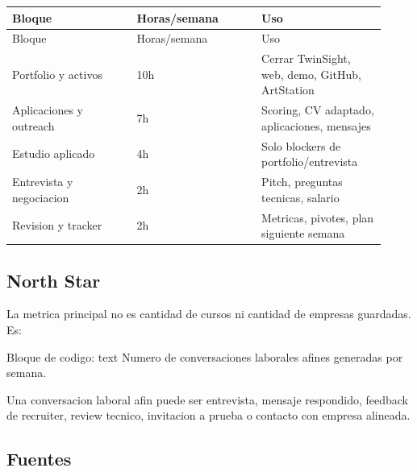 \begin{center}
\scriptsize
\begin{longtable}{>{\raggedright\arraybackslash}p{0.305\linewidth} >{\raggedright\arraybackslash}p{0.305\linewidth} >{\raggedright\arraybackslash}p{0.305\linewidth}}
\toprule
Bloque & Horas/semana & Uso \\
\midrule
\endfirsthead
\toprule
Bloque & Horas/semana & Uso \\
\midrule
\endhead
Portfolio y activos & 10h & Cerrar TwinSight, web, demo, GitHub, ArtStation \\
Aplicaciones y outreach & 7h & Scoring, CV adaptado, aplicaciones, mensajes \\
Estudio aplicado & 4h & Solo blockers de portfolio/entrevista \\
Entrevista y negociacion & 2h & Pitch, preguntas tecnicas, salario \\
Revision y tracker & 2h & Metricas, pivotes, plan siguiente semana \\
\bottomrule
\end{longtable}
\end{center}



\subsection{North Star}


La metrica principal no es cantidad de cursos ni cantidad de empresas guardadas. Es:


\begin{mdcode}
Bloque de codigo: text
Numero de conversaciones laborales afines generadas por semana.
\end{mdcode}


Una conversacion laboral afin puede ser entrevista, mensaje respondido, feedback de recruiter, review tecnico, invitacion a prueba o contacto con empresa alineada.


\subsection{Fuentes}


